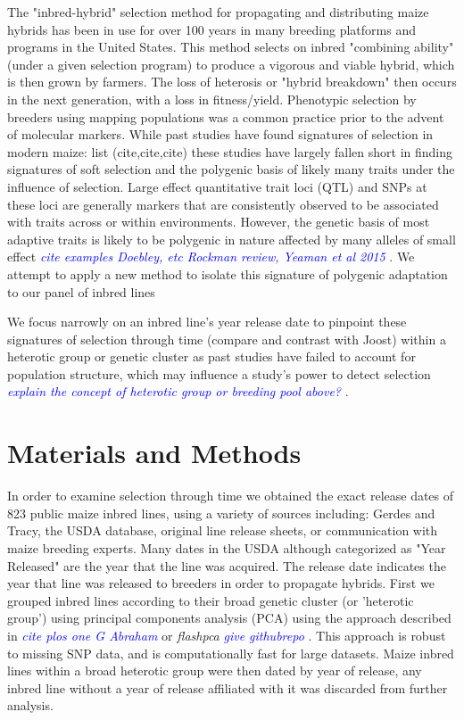 \documentclass[9pt,twocolumn,twoside]{gsajnl}
\newcommand{\kc}[1]{\textcolor{blue}{ \emph{ #1}} }
\begin{document}
The "inbred-hybrid" selection method for propagating and distributing maize hybrids has been in use for over 100 years in many breeding platforms and programs in the United States. 
This method selects on inbred "combining ability" (under a given selection program) to produce a vigorous and viable hybrid, which is then grown by farmers. 
The loss of heterosis or "hybrid breakdown" then occurs in the next generation, with a loss in fitness/yield.
Phenotypic selection by breeders using mapping populations was a common practice prior to the advent of molecular markers. 
While past studies have found signatures of selection in modern maize: list (cite,cite,cite) these studies have largely fallen short in finding signatures of soft selection and the polygenic basis of likely many traits under the influence of selection. 
Large effect quantitative trait loci (QTL) and SNPs at these loci are generally markers that are consistently observed to be associated with traits across or within environments. 
However, the genetic basis of most adaptive traits is likely to be polygenic in nature affected by many alleles of small effect \kc{cite examples Doebley, etc Rockman review, Yeaman et al 2015}. We attempt to apply a new method to isolate this signature of polygenic adaptation to our panel of inbred lines

We focus narrowly on an inbred line's year release date to pinpoint these signatures of selection through time (compare and contrast with Joost) within a heterotic group or genetic cluster as past studies have failed to account for population structure, which may influence a study's power to detect selection \kc{explain the concept of heterotic group or breeding pool above?}. 



\section*{Materials and Methods}

In order to examine selection through time we obtained the exact release dates of 823 public maize inbred lines, using a variety of sources including: Gerdes and Tracy, the USDA database, original line release sheets, or communication with maize breeding experts. Many dates in the USDA although categorized as "Year Released" are the year that the line was acquired. 
The release date indicates the year that line was released to breeders in order to propagate hybrids.
First we grouped inbred lines according to their broad genetic cluster (or 'heterotic group') using principal components analysis (PCA) using the approach described in  \kc{cite plos one G Abraham} or \textit{flashpca} \kc{give githubrepo}. 
This approach is robust to missing SNP data, and is computationally fast for large datasets.  
Maize inbred lines within a broad heterotic group were then dated by year of release, any inbred line without a year of release affiliated with it was discarded from further analysis.
\end{document}
